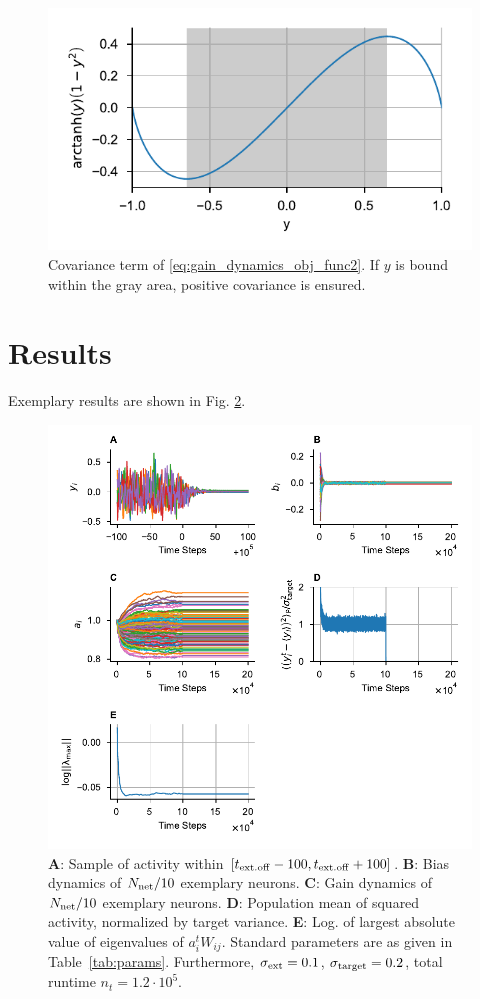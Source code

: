 \documentclass[10pt,a4paper]{article}
\begin{document}
\begin{figure}
	\centering
	\includegraphics{../plots/gain_grad_descent.pdf}
	\caption{Covariance term of \eqref{eq:gain_dynamics_obj_func2}. If $y$ is bound within the gray area, positive covariance is ensured.}
	\label{fig:gain_cov}
\end{figure}

\section{Results}
Exemplary results are shown in Fig. \ref{fig:ex_results}.

\begin{figure}[h]
\includegraphics[width=\textwidth]{../plots/res_comp.pdf}
\caption{{\bf A}: Sample of activity within $\left[ t_{\rm ext.off} - 100, t_{\rm ext.off} + 100 \right]$. {\bf B}: Bias dynamics of $N_{\rm net}/10$ exemplary neurons. {\bf C}: Gain dynamics of $N_{\rm net}/10$ exemplary neurons. {\bf D}: Population mean of squared activity, normalized by target variance. {\bf E}: Log. of largest absolute value of eigenvalues of $a_i^t W_{ij} $. Standard parameters are as given in Table~\ref{tab:params}. Furthermore, $\sigma_{\rm ext} = 0.1$, $\sigma_{\rm target} = 0.2$, total runtime $n_t = 1.2\cdot10^5$. }
\label{fig:ex_results}
\end{figure}
\end{document}

